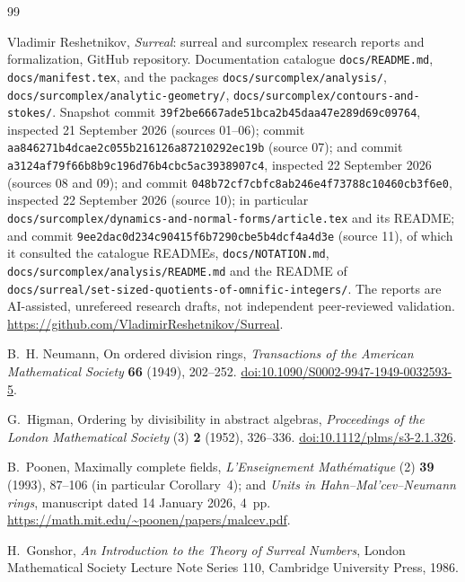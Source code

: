 \documentclass[11pt,letterpaper]{article}
\theoremstyle{definition}
\theoremstyle{remark}
\numberwithin{equation}{section}
\begin{document}
\clearpage
{}
{}
\begin{thebibliography}{99}
\raggedright

Vladimir Reshetnikov,
\emph{Surreal}: surreal and surcomplex research reports and formalization,
GitHub repository. Documentation catalogue \texttt{docs/README.md},
\texttt{docs/manifest.tex}, and the packages
\texttt{docs/surcomplex/analysis/},
\texttt{docs/surcomplex/analytic-geometry/},
\texttt{docs/surcomplex/contours-and-stokes/}. Snapshot commit
\texttt{39f2be6667ade51bca2b45daa47e289d69c09764}, inspected
21 September 2026 (sources 01--06); commit
\texttt{aa846271b4dcae2c055b216126a87210292ec19b} (source 07); and commit
\texttt{a3124af79f66b8b9c196d76b4cbc5ac3938907c4}, inspected 22 September
2026 (sources 08 and 09); and commit
\texttt{048b72cf7cbfc8ab246e4f73788c10460cb3f6e0}, inspected 22 September
2026 (source 10); in particular
\texttt{docs/surcomplex/dynamics-and-normal-forms/article.tex} and its
README; and commit \texttt{9ee2dac0d234c90415f6b7290cbe5b4dcf4a4d3e}
(source 11), of which it consulted the catalogue READMEs,
\texttt{docs/NOTATION.md}, \texttt{docs/surcomplex/analysis/README.md} and
the README of \texttt{docs/surreal/set-sized-quotients-of-omnific-integers/}. The reports are AI-assisted, unrefereed research drafts,
not independent peer-reviewed validation.
\url{https://github.com/VladimirReshetnikov/Surreal}.

B.~H. Neumann,
On ordered division rings,
\emph{Transactions of the American Mathematical Society} \textbf{66}
(1949), 202--252.
\href{https://doi.org/10.1090/S0002-9947-1949-0032593-5}{doi:10.1090/S0002-9947-1949-0032593-5}.

G.~Higman,
Ordering by divisibility in abstract algebras,
\emph{Proceedings of the London Mathematical Society} (3) \textbf{2}
(1952), 326--336.
\href{https://doi.org/10.1112/plms/s3-2.1.326}{doi:10.1112/plms/s3-2.1.326}.

B.~Poonen,
Maximally complete fields,
\emph{L'Enseignement Math\'ematique} (2) \textbf{39} (1993), 87--106
(in particular Corollary~4); and
\emph{Units in Hahn--Mal'cev--Neumann rings}, manuscript dated
14 January 2026, 4~pp.
\url{https://math.mit.edu/~poonen/papers/malcev.pdf}.

H.~Gonshor,
\emph{An Introduction to the Theory of Surreal Numbers},
London Mathematical Society Lecture Note Series 110,
Cambridge University Press, 1986.


\end{thebibliography}
\end{document}
